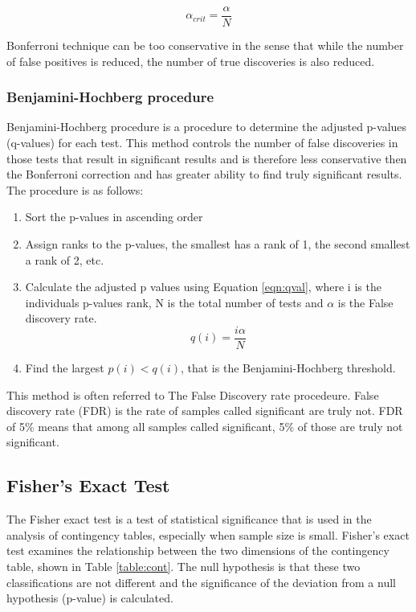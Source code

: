 \begin{equation}
    \label{eqn:Bonferroni}
        \alpha_{crit} = \frac{\alpha}{N}
\end{equation}


Bonferroni technique can be too conservative in the sense that while the number of false positives is reduced, the number of true discoveries is also reduced.


\subsubsection{Benjamini-Hochberg procedure}
Benjamini-Hochberg procedure is a procedure to determine the adjusted p-values (q-values) for each test. This method controls the number of false discoveries in those tests that result in significant results and is therefore less conservative then the Bonferroni correction and has greater ability to find truly significant results. The procedure is as follows:

\begin{enumerate}
    \item Sort the p-values in ascending order
    \item Assign ranks to the p-values, the smallest has a rank of 1, the second smallest a rank of 2, etc.
    \item Calculate the adjusted p values using Equation \ref{eqn:qval}, where i is the individuals p-values rank, N is the total number of tests and $\alpha$ is the False discovery rate.
        \begin{equation}
            \label{eqn:qval}
            q(i) = \frac{i\alpha}{N}
        \end{equation}
    \item Find the largest $p(i) < q(i)$, that is the Benjamini-Hochberg threshold.
\end{enumerate}


This method is often referred to The False Discovery rate procedeure. False discovery rate (FDR) is the rate of samples called significant are truly not. FDR of 5\% means that among all samples called significant, 5\% of those are truly not significant. 

\subsection{Fisher's Exact Test}
The Fisher exact test is a test of statistical significance that is used in the analysis of contingency tables, especially when sample size is small. Fisher's exact test examines the relationship between the two dimensions of the contingency table, shown in Table \ref{table:cont}. The null hypothesis is that these two classifications are not different and the significance of the deviation from a null hypothesis (p-value) is calculated.

